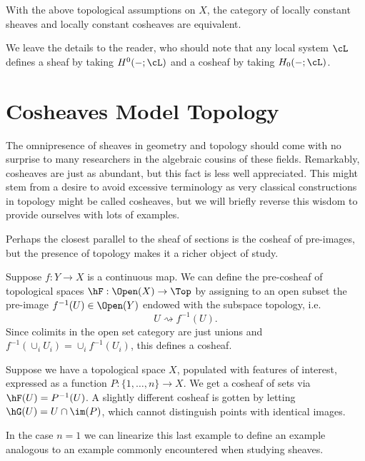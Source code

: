 \begin{cor}
With the above topological assumptions on $X$, the category of locally constant sheaves and locally constant cosheaves are equivalent.
\end{cor}

We leave the details to the reader, who should note that any local system $\cL$ defines a sheaf by taking $H^0(-;\cL)$ and a cosheaf by taking $H_0(-;\cL)$.

\section{Cosheaves Model Topology}

The omnipresence of sheaves in geometry and topology should come with no surprise to many researchers in the algebraic cousins of these fields. Remarkably, cosheaves are just as abundant, but this fact is less well appreciated. This might stem from a desire to avoid excessive terminology as very classical constructions in topology might be called cosheaves, but we will briefly reverse this wisdom to provide ourselves with lots of examples.

Perhaps the closest parallel to the sheaf of sections is the cosheaf of pre-images, but the presence of topology makes it a richer object of study.

\begin{defn}
	Suppose $f:Y\to X$ is a continuous map. We can define the pre-cosheaf of topological spaces $\hF:\Open(X)\to\Top$ by assigning to an open subset the pre-image $f^{-1}(U)\in\Open(Y)$ endowed with the subspace topology, i.e.
	\[
	U \rightsquigarrow f^{-1}(U).
	\]
	Since colimits in the open set category are just unions and $f^{-1}(\cup_i U_i)=\cup_i f^{-1}(U_i)$, this defines a cosheaf.
\end{defn}

\begin{ex}
	Suppose we have a topological space $X$, populated with features of interest, expressed as a function $P:\{1,\ldots, n\}\to X$. We get a cosheaf of sets via $\hF(U)=P^{-1}(U)$. A slightly different cosheaf is gotten by letting $\hG(U)=U\cap\im(P)$, which cannot distinguish points with identical images.
\end{ex}

In the case $n=1$ we can linearize this last example to define an example analogous to an example commonly encountered when studying sheaves.

